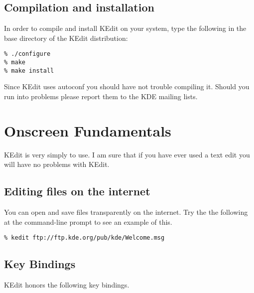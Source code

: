 \documentclass{article}
\begin{document}
\subsection{Compilation and installation}



In order to compile and install KEdit on your system, type the following in the base 
directory of the KEdit distribution:
\begin{tscreen}
\begin{verbatim}
% ./configure
% make
% make install
\end{verbatim}
\end{tscreen}




Since KEdit uses {\ttfamily autoconf} you should have not trouble compiling it.
Should you run into problems please report them to the {\sffamily KDE} mailing lists.




\section{Onscreen Fundamentals}



KEdit is very simply to use. I am sure that if you have ever used a text edit you 
will have no problems with KEdit. 






\subsection{Editing files on the internet}

You can open and save files transparently on the internet. Try the the following at the
command-line prompt to see an example of this.

\begin{tscreen}
\begin{verbatim}
% kedit ftp://ftp.kde.org/pub/kde/Welcome.msg
\end{verbatim}
\end{tscreen}





\subsection{Key Bindings}

KEdit honors the following key bindings.
\end{document}
